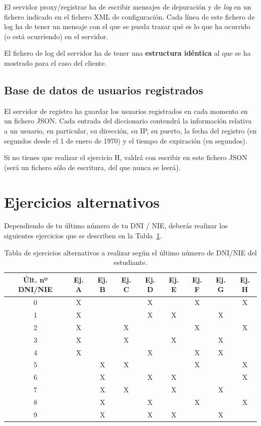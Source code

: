 \documentclass[a4paper,11pt]{article}
\begin{document}
El servidor proxy/registrar ha de escribir mensajes de depuración y de \emph{log} en un fichero indicado en el fichero XML de configuración. Cada línea de este fichero de log ha de tener un mensaje con el que se pueda trazar qué es lo que ha ocurrido (o está ocurriendo) en el servidor.

El fichero de log del servidor ha de tener una {\bf estructura idéntica} al que se
ha mostrado para el caso del cliente.


\subsection{Base de datos de usuarios registrados}

El servidor de registro ha guardar los usuarios registrados en cada momento en un fichero JSON. Cada entrada del diccionario contendrá la información relativa a un usuario, en particular, su dirección, su IP, su puerto, la fecha del registro (en segundos desde el 1 de enero de 1970) y el tiempo de expiración (en segundos).

Si no tienes que realizar el ejercicio H, valdrá con escribir en este fichero JSON (será un fichero sólo de escritura, del que nunca se leerá).


\section{Ejercicios alternativos}

Dependiendo de tu último número de tu DNI / NIE, deberás realizar los siguientes ejercicios que se describen en la Tabla~\ref{tab:ejercicios}.

\begin{center}
  \begin{table}[h!]
    \center
    \begin{tabular}{| c | c | c | c | c | c | c | c | c |} \hline
    Últ. nº DNI/NIE & Ej. A & Ej. B & Ej. C & Ej. D & Ej. E & Ej. F & Ej. G & Ej. H \\ \hline \hline
    0 & X &   &   & X &   & X &   & X \\ \hline
    1 & X &   &   & X & X &  & X &  \\ \hline
    2 & X &   & X &   &   & X &   & X \\ \hline
    3 & X &   & X &   & X &  & X &  \\ \hline
    4 & X &   &   & X &   & X & X & \\ \hline
    5 &   & X & X &   &   & X &   & X \\ \hline
    6 &   & X &   & X & X & &  & X \\ \hline
    7 &   & X & X &   & X & & X & \\ \hline
    8 &   & X &   & X &   & X &   & X \\ \hline
    9 &   & X &   & X & X & & X & \\ \hline
    \end{tabular}
  \caption{Tabla de ejercicios alternativos a realizar según el último número de DNI/NIE del estudiante.}
  \label{tab:ejercicios}
  \end{table}
\end{center}
\end{document}
